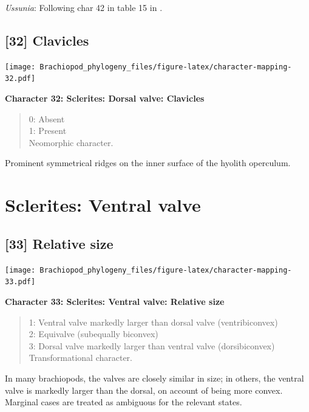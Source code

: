 \documentclass[openany]{book}
\theoremstyle{definition}
\theoremstyle{definition}
\theoremstyle{definition}
\theoremstyle{remark}
\begin{document}
\hypertarget{Ussunia-coding-31}{}
\emph{Ussunia}: Following char 42 in table 15 in
\citet{Williams2000LinguliformeaCraniiformea}.

\subsection*{{[}32{]} Clavicles}\label{clavicles}

\texttt{[image: Brachiopod\_phylogeny\_files/figure-latex/character-mapping-32.pdf]}

\textbf{Character 32: Sclerites: Dorsal valve: Clavicles}

\begin{quote}
0: Absent\\
1: Present\\
Neomorphic character.
\end{quote}

Prominent symmetrical ridges on the inner surface of the hyolith
operculum.

\section{Sclerites: Ventral valve}\label{sclerites-ventral-valve}

\subsection*{{[}33{]} Relative size}\label{relative-size}

\texttt{[image: Brachiopod\_phylogeny\_files/figure-latex/character-mapping-33.pdf]}

\textbf{Character 33: Sclerites: Ventral valve: Relative size}

\begin{quote}
1: Ventral valve markedly larger than dorsal valve (ventribiconvex)\\
2: Equivalve (subequally biconvex)\\
3: Dorsal valve markedly larger than ventral valve (dorsibiconvex)\\
Transformational character.
\end{quote}

In many brachiopods, the valves are closely similar in size; in others,
the ventral valve is markedly larger than the dorsal, on account of
being more convex. Marginal cases are treated as ambiguous for the
relevant states.
\end{document}

